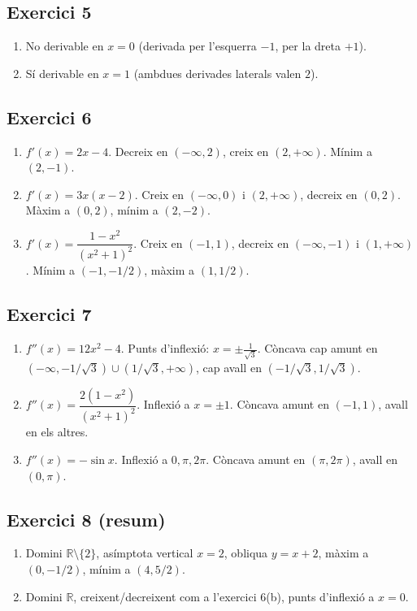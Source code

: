 \documentclass[12pt]{article}
\begin{document}
\subsection*{Exercici 5}
\begin{enumerate}[label=\alph*)]
    \item No derivable en $x=0$ (derivada per l'esquerra $-1$, per la dreta $+1$).
    \item Sí derivable en $x=1$ (ambdues derivades laterals valen $2$).
\end{enumerate}

\subsection*{Exercici 6}
\begin{enumerate}[label=\alph*)]
    \item $f'(x)=2x-4$. Decreix en $(-\infty,2)$, creix en $(2,+\infty)$. Mínim a $(2,-1)$.
    \item $f'(x)=3x(x-2)$. Creix en $(-\infty,0)$ i $(2,+\infty)$, decreix en $(0,2)$. Màxim a $(0,2)$, mínim a $(2,-2)$.
    \item $f'(x)=\dfrac{1-x^2}{(x^2+1)^2}$. Creix en $(-1,1)$, decreix en $(-\infty,-1)$ i $(1,+\infty)$. Mínim a $(-1,-1/2)$, màxim a $(1,1/2)$.
\end{enumerate}

\subsection*{Exercici 7}
\begin{enumerate}[label=\alph*)]
    \item $f''(x)=12x^2-4$. Punts d'inflexió: $x=\pm\frac{1}{\sqrt{3}}$. Còncava cap amunt en $(-\infty,-1/\sqrt{3})\cup(1/\sqrt{3},+\infty)$, cap avall en $(-1/\sqrt{3},1/\sqrt{3})$.
    \item $f''(x)=\dfrac{2(1-x^2)}{(x^2+1)^2}$. Inflexió a $x=\pm1$. Còncava amunt en $(-1,1)$, avall en els altres.
    \item $f''(x)=-\sin x$. Inflexió a $0,\pi,2\pi$. Còncava amunt en $(\pi,2\pi)$, avall en $(0,\pi)$.
\end{enumerate}

\subsection*{Exercici 8 (resum)}
\begin{enumerate}[label=\alph*)]
    \item Domini $\mathbb{R}\setminus\{2\}$, asímptota vertical $x=2$, obliqua $y=x+2$, màxim a $(0,-1/2)$, mínim a $(4,5/2)$.
    \item Domini $\mathbb{R}$, creixent/decreixent com a l'exercici 6(b), punts d'inflexió a $x=0$.
\end{enumerate}
\end{document}
